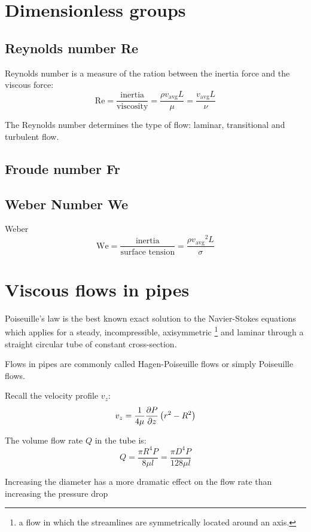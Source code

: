 \documentclass[10pt, twocolumn]{article}
\begin{document}
\section{Dimensionless groups}


\subsection{Reynolds number Re}
Reynolds number is a measure of the ration between the inertia force and the viscous force:
\[
  \mathrm{Re} = \frac{\mathrm{inertia}}{\text{viscosity}} = \frac{\rho v_\mathrm{avg} L}{\mu} = \frac{v_\mathrm{avg} L}{\nu}
\]

The Reynolds number determines the type of flow: laminar, transitional and turbulent flow.


\subsection{Froude number Fr}


\subsection{Weber Number We}
Weber
\[
  \mathrm{We} = \frac{\mathrm{inertia}}{\text{surface tension}} = \frac{\rho {v_\mathrm{avg}}^2 L}{\sigma}
\]





\section{Viscous flows in pipes}
Poiseuille's law is the best known exact solution to the Navier-Stokes equations which applies for a steady, incompressible, axisymmetric \footnote{a flow in which the streamlines are symmetrically located around an axis.} and laminar through a straight circular tube of constant cross-section.

Flows in pipes are commonly called Hagen-Poiseuille flows or simply Poiseuille flows.

Recall the velocity profile \(v_z\):
\[
  v_z = \frac{1}{4\mu} \frac{\partial P}{\partial z} \left( r^2 - R^2 \right)
\]

The volume flow rate \(Q\) in the tube is:
\[
  Q = \frac{\pi R^4 P}{8 \mu l} = \frac{\pi D^4 P}{128 \mu l}
\]

\begin{remark}
  Increasing the diameter has a more dramatic effect on the flow rate than increasing the pressure drop
\end{remark}
\end{document}
